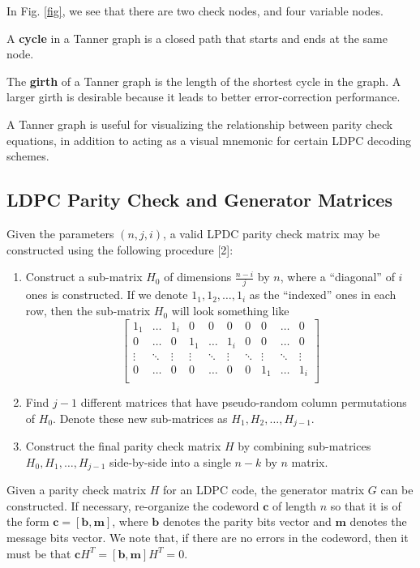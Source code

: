 \documentclass[conference]{IEEEtran}
\begin{document}
In Fig. \ref{fig}, we see that there are two check nodes, and four variable nodes.

A \textbf{cycle} in a Tanner graph is a closed path that starts and ends at the same node.

The \textbf{girth} of a Tanner graph is the length of the shortest cycle in the graph.
A larger girth is desirable because it leads to better error-correction performance.

A Tanner graph is useful for visualizing the relationship between parity check equations, in addition to acting as a visual mnemonic for certain LDPC decoding schemes.

\subsection{LDPC Parity Check and Generator Matrices}\label{matrices}
Given the parameters $(n,j,i)$, a valid LPDC parity check matrix may be constructed using the following procedure [2]:
\begin{enumerate}
  \item Construct a sub-matrix $H_0$ of dimensions $\frac{n-i}{j}$ by $n$, where a ``diagonal'' of $i$ ones is constructed.
    If we denote $1_1, 1_2, \ldots, 1_i$ as the ``indexed'' ones in each row, then the sub-matrix $H_0$ will look something like
    $$\begin{bmatrix}
      1_1   &\ldots& 1_i  & 0    & 0    & 0    & 0    &0     &\ldots& 0\\
      0     &\ldots& 0    & 1_1  &\ldots& 1_i  & 0    &0     &\ldots& 0\\
      \vdots&\ddots&\vdots&\vdots&\ddots&\vdots&\ddots&\vdots&\ddots&\vdots \\
      0     &\ldots& 0    & 0    &\ldots& 0    & 0    & 1_1  &\ldots& 1_i \\
    \end{bmatrix}$$
  \item Find $j - 1$ different matrices that have pseudo-random column permutations of $H_0$. Denote these new sub-matrices as $H_1, H_2, \ldots, H_{j-1}$.
  \item Construct the final parity check matrix $H$ by combining sub-matrices $H_0,H_1,\ldots,H_{j-1}$ side-by-side into a single $n-k$ by $n$ matrix.
\end{enumerate}

Given a parity check matrix $H$ for an LDPC code, the generator matrix $G$ can
be constructed.
If necessary, re-organize the codeword $\textbf{c}$ of length $n$ so that it is of the form $\textbf{c} = [\textbf{b}, \textbf{m}]$, where $\textbf{b}$ denotes the parity bits vector and $\textbf{m}$ denotes the message bits vector.
    We note that, if there are no errors in the codeword, then it must be that $\textbf{c}H^T = [\textbf{b}, \textbf{m}]H^T = 0$.
\end{document}
